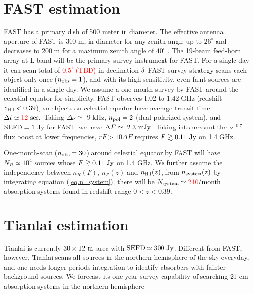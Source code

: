 \documentclass[]{raa}
\newcommand{\HI}{{H{\small\,I}}}
\newcommand{\tcr}{\textcolor{red}}
\begin{document}
\section{FAST estimation}\label{sec.FAST}

FAST has a primary dish of 500 meter in diameter. The effective
antenna aperture of FAST is 300 m, in diameter for any zenith angle
up to $26^\circ$ and decreases to 200 m for a maximum zenith angle 
of $40^\circ$ \citep{2016RaSc...51.1060L}.
The 19-beam feed-horn array at L band will be the primary survey
instrument for FAST. For a single day it can scan total of \tcr{$0.5^\circ$ (TBD)}
in declination $\delta$. FAST survey strategy scans each object
only once ($n_{\rm obs}=1$), and with its high sensitivity,
even faint sources are identified in a single day. 
We assume a one-month survey by FAST
around the celestial equator for simplicity. FAST observes
1.02 to 1.42 GHz (redshift $z_{\rm \HI}<0.39$), so objects on celestial equator
have average transit time $\Delta t \simeq \tcr{12}\ {\rm sec.}$
Taking $\Delta\nu\simeq$ 9 kHz, $n_{\rm pol}=2$
(dual polarized system), and
${\rm SEFD}=1$ Jy for FAST.
we have $\Delta F \simeq\ 2.3\ {\rm mJy}$.
Taking into account the $\nu^{-0.7}$ flux boost at lower
frequencies, $rF>10\Delta F$ requires $F\gtrsim 0.11\ {\rm Jy}$ on 1.4 GHz.

One-month-scan ($n_{\rm obs}=30$) around celestial equator by FAST will have
$N_R\simeq 10^4$ sources whose $F\gtrsim 0.11\ {\rm Jy}$ on 1.4 GHz.
We further assume the independency between $n_R(F)$, $n_R(z)$
and $n_{\rm\HI}(z)$, from $n_{\rm system}(z)$ by integrating
equation (\ref{eq.n_system}), there will be $N_{\rm system}\simeq \tcr{210} {\rm /month}$ absorption
systems found in redshift range $0<z<0.39$.


\section{Tianlai estimation}\label{sec.Tianlai}

Tianlai is currently $30\times 12\ {\rm m}$ area with
${\rm SEFD}\simeq 300\ {\rm Jy}$. Different from FAST, however,
Tianlai scans all sources in the northern hemisphere of the sky
everyday, and one needs longer periods integration to
identify absorbers with fainter background sources.
We forecast its one-year-survey capability of searching 21-cm
absorption systems in the northern hemisphere.
\end{document}
